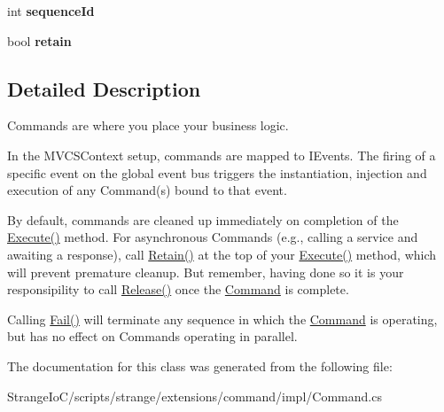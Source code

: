 \begin{DoxyCompactItemize}
\item 
\hypertarget{classstrange_1_1extensions_1_1command_1_1impl_1_1_command_aa73766a45e3f739d77662fb2e909ee1e}{int {\bfseries sequence\-Id}}\label{classstrange_1_1extensions_1_1command_1_1impl_1_1_command_aa73766a45e3f739d77662fb2e909ee1e}

\item 
\hypertarget{classstrange_1_1extensions_1_1command_1_1impl_1_1_command_adf51b3ae205b21b57e76ba3aad11bc74}{bool {\bfseries retain}}\label{classstrange_1_1extensions_1_1command_1_1impl_1_1_command_adf51b3ae205b21b57e76ba3aad11bc74}

\end{DoxyCompactItemize}


\subsection{Detailed Description}
Commands are where you place your business logic. 

In the M\-V\-C\-S\-Context setup, commands are mapped to I\-Events. The firing of a specific event on the global event bus triggers the instantiation, injection and execution of any Command(s) bound to that event.

By default, commands are cleaned up immediately on completion of the {\ttfamily \hyperlink{classstrange_1_1extensions_1_1command_1_1impl_1_1_command_a4a1155270428842c342482c6885b2652}{Execute()}} method. For asynchronous Commands (e.\-g., calling a service and awaiting a response), call {\ttfamily \hyperlink{classstrange_1_1extensions_1_1command_1_1impl_1_1_command_a1525def9650d4b6ed6ed6cef2936d892}{Retain()}} at the top of your {\ttfamily \hyperlink{classstrange_1_1extensions_1_1command_1_1impl_1_1_command_a4a1155270428842c342482c6885b2652}{Execute()}} method, which will prevent premature cleanup. But remember, having done so it is your responsipility to call {\ttfamily \hyperlink{classstrange_1_1extensions_1_1command_1_1impl_1_1_command_a783b532e62f1c5c7789ae1a5791c75c7}{Release()}} once the \hyperlink{classstrange_1_1extensions_1_1command_1_1impl_1_1_command}{Command} is complete.

Calling {\ttfamily \hyperlink{classstrange_1_1extensions_1_1command_1_1impl_1_1_command_aa91c0b75c21945fdf87105d806d3ba79}{Fail()}} will terminate any sequence in which the \hyperlink{classstrange_1_1extensions_1_1command_1_1impl_1_1_command}{Command} is operating, but has no effect on Commands operating in parallel. 

The documentation for this class was generated from the following file\-:\begin{DoxyCompactItemize}
\item 
Strange\-Io\-C/scripts/strange/extensions/command/impl/Command.\-cs\end{DoxyCompactItemize}
